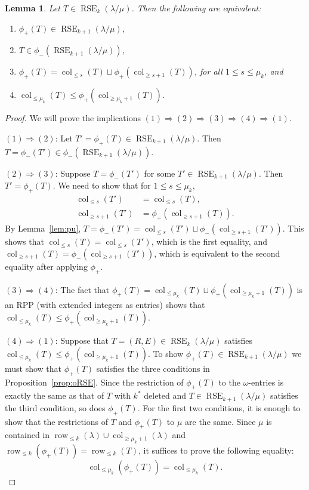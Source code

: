 \documentclass{amsart}
\numberwithin{equation}{section}
\newtheorem{lem}[thm]{Lemma}
\theoremstyle{definition}
\newcommand\col{\operatorname{col}}
\newcommand\row{\operatorname{row}}
\newcommand\pd{\phi_+}
\newcommand\pu{\phi_-}
\newcommand\RSE{\operatorname{RSE}}
\newcommand\lm{{\lambda/\mu}}
\begin{document}
\begin{lem}\label{lem:pd}
  Let $T\in\RSE_{k}(\lm)$. Then the following are equivalent:
  \begin{enumerate}
  \item $\pd(T)\in \RSE_{k+1}(\lm)$,
  \item $T\in \pu(\RSE_{k+1}(\lm))$,
  \item $\pd(T) = \col_{\le s}(T) \sqcup \pd(\col_{\ge s+1}(T))$, for all $1\le
    s\le \mu_k$, and
  \item $\col_{\le \mu_k}(T) \le \pd(\col_{\ge \mu_k+1}(T))$.
  \end{enumerate}
\end{lem}
\begin{proof}
We will prove the implications $(1)\Rightarrow (2) \Rightarrow (3)\Rightarrow
(4)\Rightarrow (1)$. 

$(1)\Rightarrow (2)$: Let $T'=\pd(T)\in\RSE_{k+1}(\lm)$. Then $T=\pu(T')\in
\pu(\RSE_{k+1}(\lm))$.


$(2)\Rightarrow (3)$: Suppose $T=\pu(T')$ for some $T'\in\RSE_{k+1}(\lm)$. Then
$T' = \pd(T)$. We need to show that for $1\le s\le \mu_k$, 
\begin{align*}
  \col_{\le s}(T') &= \col_{\le s}(T),\\ 
  \col_{\ge s+1}(T') &= \pd(\col_{\ge s+1}(T)).
\end{align*}
By Lemma~\ref{lem:pu}, $T=\pu(T') = \col_{\le s}(T') \sqcup \pu(\col_{\ge
  s+1}(T'))$. This shows that $\col_{\le s}(T)=\col_{\le s}(T')$, which
is the first equality, and $\col_{\ge s+1}(T)=\pu(\col_{\ge s+1}(T'))$,
which is equivalent to the second equality after applying $\pd$. 

$(3)\Rightarrow (4)$: The fact that $\pd(T) = \col_{\le \mu_k}(T) \sqcup
\pd(\col_{\ge \mu_k+1}(T))$ is an RPP (with extended integers as entries) shows
that $\col_{\le \mu_k}(T) \le \pd(\col_{\ge \mu_k+1}(T))$.


$(4)\Rightarrow (1)$: Suppose that $T=(R,E)\in\RSE_{k}(\lm)$ satisfies
$\col_{\le \mu_k}(T) \le \pd(\col_{\ge \mu_k+1}(T))$. To show $\pd(T)\in
\RSE_{k+1}(\lm)$ we must show that $\pd(T)$ satisfies the three conditions in
Proposition~\ref{prop:oRSE}. Since the restriction of $\pd(T)$ to the
$\omega$-entries is exactly the same as that of $T$ with $k^*$ deleted and
$T\in\RSE_{k+1}(\lm)$ satisfies the third condition, so does $\pd(T)$. For the
first two conditions, it is enough to show that the restrictions of $T$ and
$\pd(T)$ to $\mu$ are the same. Since $\mu$ is contained in $\row_{\le
  k}(\lambda) \cup \col_{\ge\mu_k+1}(\lambda)$ and $\row_{\le
  k}(\pd(T))=\row_{\le k}(T)$, it suffices to prove the following equality:
\begin{equation}
  \label{eq:2}
\col_{\le \mu_k}(\pd(T))= \col_{\le \mu_k}(T).  
\end{equation}


\end{proof}
\end{document}
